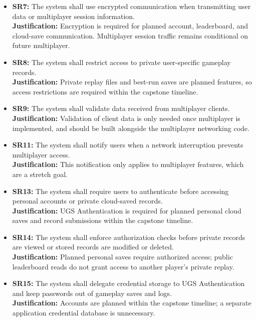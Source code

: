 \documentclass{article}
\newcommand{\reqref}[1]{#1}
\begin{document}
\begin{itemize}
    \item \textbf{\reqref{SR7}:} The system shall use encrypted communication when transmitting user data or multiplayer session information.\\
    \textbf{Justification:} Encryption is required for planned account, leaderboard, and cloud-save communication. Multiplayer session traffic remains conditional on future multiplayer.

    \item \textbf{\reqref{SR8}:} The system shall restrict access to private user-specific gameplay records.\\
    \textbf{Justification:} Private replay files and best-run saves are planned features, so access restrictions are required within the capstone timeline.

    \item \textbf{\reqref{SR9}:} The system shall validate data received from multiplayer clients.\\
    \textbf{Justification:} Validation of client data is only needed once multiplayer is implemented, and should be built alongside the multiplayer networking code.

    \item \textbf{\reqref{SR11}:} The system shall notify users when a network interruption prevents multiplayer access.\\
    \textbf{Justification:} This notification only applies to multiplayer features, which are a stretch goal.

    \item \textbf{\reqref{SR13}:} The system shall require users to authenticate before accessing personal accounts or private cloud-saved records.\\
    \textbf{Justification:} UGS Authentication is required for planned personal cloud saves and record submissions within the capstone timeline.

    \item \textbf{\reqref{SR14}:} The system shall enforce authorization checks before private records are viewed or stored records are modified or deleted.\\
    \textbf{Justification:} Planned personal saves require authorized access; public leaderboard reads do not grant access to another player's private replay.

    \item \textbf{\reqref{SR15}:} The system shall delegate credential storage to UGS Authentication and keep passwords out of gameplay saves and logs.\\
    \textbf{Justification:} Accounts are planned within the capstone timeline; a separate application credential database is unnecessary.


\end{itemize}
\end{document}
